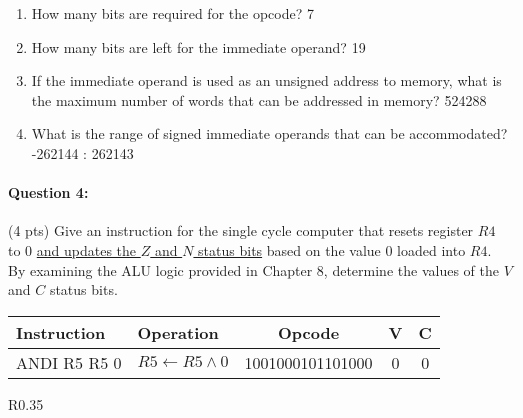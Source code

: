 \documentclass[12pt,letterpaper,titlepage]{report}
\begin{document}
\begin{raggedright}
\begin{enumerate}[noitemsep, label=\alph*)]
\item How many bits are required for the opcode? 7
\item How many bits are left for the immediate operand? 19
\item If the immediate operand is used as an unsigned address to memory, what is the maximum number of words that can be addressed in memory? 524288
\item What is the range of signed immediate operands that can be accommodated? -262144 : 262143
\end{enumerate}

\paragraph{Question 4:}
(4 pts) Give an instruction for the single cycle computer that resets register $R4$ to 0 \underline{and updates the $Z$ and $N$ status bits} based on the value 0 loaded into $R4$. By examining the ALU logic provided in Chapter 8, determine the values of the $V$ and $C$ status bits.

\begin{center}
\begin{tabular}{|l|l|c|c|c|}\hline
Instruction  & Operation             & Opcode           & V & C \\ \hline\hline
ANDI R5 R5 0 & $R5 \gets R5 \land 0$ & 1001000101101000 & 0 & 0 \\ \hline
\end{tabular}
\end{center}

\begin{wraptable}[23]{R}{0.35\textwidth}
\centering
\def\arraystretch{1.5}


\end{wraptable}
\end{raggedright}
\end{document}
